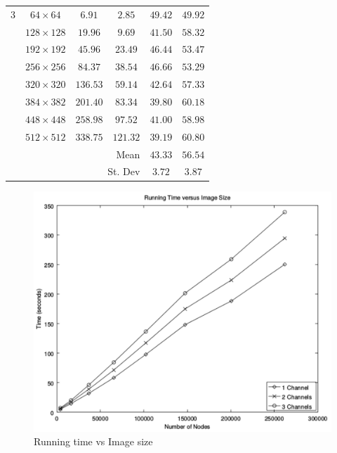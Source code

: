 \documentclass[a4paper,11pt]{ijamas}
\begin{document}
{{\begin{table}
\begin{tabular}{cccccc}
3 		  	& $64\times64$ 	&$6.91$ &$2.85$ & $49.42$	&$49.92$ \\
 			& $128\times128$ &$19.96$ &$9.69$ &$41.50$	&$58.32$ \\
          	& $192\times192$ &$45.96$ &$23.49$ &$46.44$&$53.47$ \\
          	& $256\times256$	&$84.37$ &$38.54$ &$46.66$&$53.29$ \\
          	& $320\times320$ &$136.53$&$59.14$ &$42.64$&$57.33$ \\
          	& $384\times382$ &$201.40$&$83.34$ &$39.80$&$60.18$ \\
          	& $448\times448$ &$258.98$&$97.52$ &$41.00$&$58.98$ \\
          	& $512\times512$ &$338.75$&$121.32$&$39.19$&$60.80$ \\
          	\hline
          	\multicolumn{4}{r}{Mean} & $43.33$ & $56.54$ \\
          	\multicolumn{4}{r}{St. Dev} & $3.72$ & $3.87$ \\
          	\hline
\end{tabular}
\end{table}
}

\begin{figure}
\centering
\includegraphics[width=0.80\columnwidth]{./figs/runningtime}
\caption{Running time vs Image size}
\label{fig:results_runningtime}
\end{figure}

}
\end{document}
